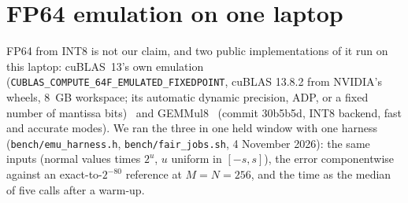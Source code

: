 \section{FP64 emulation on one laptop}\label{sec:emu}
FP64 from INT8 is not our claim, and two public implementations of it run on this laptop: cuBLAS~13's own emulation
(\texttt{CUBLAS\_COMPUTE\_64F\_EMULATED\_FIXEDPOINT}, cuBLAS 13.8.2 from NVIDIA's wheels, 8~GB workspace; its automatic dynamic
precision, ADP, or a fixed number of mantissa bits)~\cite{nvemu,cublasdoc} and GEMMul8~\cite{gemmul8} (commit 30b5b5d, INT8
backend, fast and accurate modes). We ran the three in one held window with one harness (\texttt{bench/emu\_harness.h},
\texttt{bench/fair\_jobs.sh}, 4 November 2026): the same inputs (normal values times $2^{u}$, $u$ uniform in $[-s,s]$), the error
componentwise against an exact-to-$2^{-80}$ reference at $M=N=256$, and the time as the median of five calls after a warm-up.

